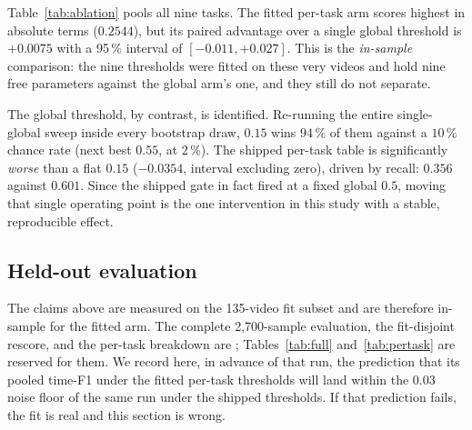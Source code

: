 Table~\ref{tab:ablation} pools all nine tasks. The fitted per-task arm scores
highest in absolute terms ($0.2544$), but its paired advantage over a single global
threshold is $+0.0075$ with a 95\,\% interval of $[-0.011,+0.027]$. This is the
\emph{in-sample} comparison: the nine thresholds were fitted on these very videos
and hold nine free parameters against the global arm's one, and they still do not
separate.

The global threshold, by contrast, is identified. Re-running the entire single-global
sweep inside every bootstrap draw, $0.15$ wins $94\,\%$ of them against a $10\,\%$
chance rate (next best $0.55$, at $2\,\%$). The shipped per-task table is
significantly \emph{worse} than a flat $0.15$ ($-0.0354$, interval excluding zero),
driven by recall: $0.356$ against $0.601$. Since the shipped gate in fact fired at a
fixed global $0.5$, moving that single operating point is the one intervention in
this study with a stable, reproducible effect.

\subsection{Held-out evaluation}

The claims above are measured on the 135-video fit subset and are therefore
in-sample for the fitted arm. The complete 2{,}700-sample evaluation, the
fit-disjoint rescore, and the per-task breakdown are \PENDING; Tables~\ref{tab:full}
and~\ref{tab:pertask} are reserved for them. We record here, in advance of that run,
the prediction that its pooled time-F1 under the fitted per-task thresholds will
land within the $0.03$ noise floor of the same run under the shipped thresholds. If
that prediction fails, the fit is real and this section is wrong.
